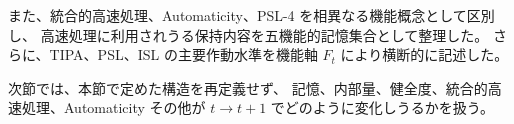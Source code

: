 また、統合的高速処理、Automaticity、PSL-4 を相異なる機能概念として区別し、
高速処理に利用されうる保持内容を五機能的記憶集合として整理した。
さらに、TIPA、PSL、ISL の主要作動水準を機能軸 $F_t$ により横断的に記述した。

次節では、本節で定めた構造を再定義せず、
記憶、内部量、健全度、統合的高速処理、Automaticity その他が
$t\to t+1$ でどのように変化しうるかを扱う。
